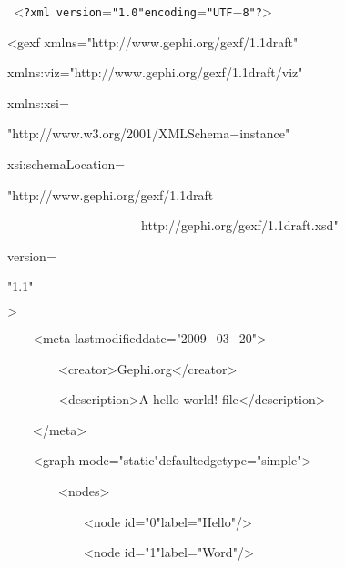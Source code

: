 


{
\tt
{\hlstd }{\hlkwa $\mathord{<}$?xml version$\mathord{=}$}{\hlstr "1.0"}{\hlkwa  encoding$\mathord{=}$}{\hlstr "UTF$\mathord{-}$8"}{\hlkwa ?$\mathord{>}$}{\hlstd }\leavevmode\par
{\hlkwa $\mathord{<}$gexf xmlns$\mathord{=}$}{\hlstr "http://www.gephi.org/gexf/1.1draft"}{\hlkwa }\leavevmode\par
{\hlstd  xmlns:viz$\mathord{=}$}{\hlstr "http://www.gephi.org/gexf/1.1draft/viz"}{\hlstd \leavevmode\par
 xmlns:xsi$\mathord{=}$}{\hlstr "http://www.w3.org/2001/XMLSchema$\mathord{-}$instance"}{\hlstd \leavevmode\par
 xsi:schemaLocation$\mathord{=}$}{\hlstr "http://www.gephi.org/gexf/1.1draft}\leavevmode\par
{\hlstr }{\hlstd\ \ \ \ \ \ \ \ \ \ \ \ \ \ \ \ \ \ \ \ \ }{\hlstr http://gephi.org/gexf/1.1draft.xsd"}{\hlstd \leavevmode\par
 version$\mathord{=}$}{\hlstr "1.1"}{\hlstd $\mathord{>}$\leavevmode\par
}{\hlstd\ \ \ \ }{\hlstd }{\hlkwa $\mathord{<}$meta lastmodifieddate$\mathord{=}$}{\hlstr "2009$\mathord{-}$03$\mathord{-}$20"}{\hlkwa $\mathord{>}$}{\hlstd \leavevmode\par
}{\hlstd\ \ \ \ \ \ \ \ }{\hlstd }{\hlkwa $\mathord{<}$creator$\mathord{>}$}{\hlstd Gephi.org}{\hlkwa $\mathord{<}$/creator$\mathord{>}$}{\hlstd \leavevmode\par
}{\hlstd\ \ \ \ \ \ \ \ }{\hlstd }{\hlkwa $\mathord{<}$description$\mathord{>}$}{\hlstd A hello world! file}{\hlkwa $\mathord{<}$/description$\mathord{>}$}{\hlstd \leavevmode\par
}{\hlstd\ \ \ \ }{\hlstd }{\hlkwa $\mathord{<}$/meta$\mathord{>}$}{\hlstd \leavevmode\par
}{\hlstd\ \ \ \ }{\hlstd }{\hlkwa $\mathord{<}$graph mode$\mathord{=}$}{\hlstr "static"}{\hlkwa  defaultedgetype$\mathord{=}$}{\hlstr "simple"}{\hlkwa $\mathord{>}$}{\hlstd \leavevmode\par
}{\hlstd\ \ \ \ \ \ \ \ }{\hlstd }{\hlkwa $\mathord{<}$nodes$\mathord{>}$}{\hlstd \leavevmode\par
}{\hlstd\ \ \ \ \ \ \ \ \ \ \ \ }{\hlstd }{\hlkwa $\mathord{<}$node id$\mathord{=}$}{\hlstr "0"}{\hlkwa  label$\mathord{=}$}{\hlstr "Hello"}{\hlkwa  /$\mathord{>}$}{\hlstd \leavevmode\par
}{\hlstd\ \ \ \ \ \ \ \ \ \ \ \ }{\hlstd }{\hlkwa $\mathord{<}$node id$\mathord{=}$}{\hlstr "1"}{\hlkwa  label$\mathord{=}$}{\hlstr "Word"}{\hlkwa  /$\mathord{>}$}{\hlstd \leavevmode\par
}}
